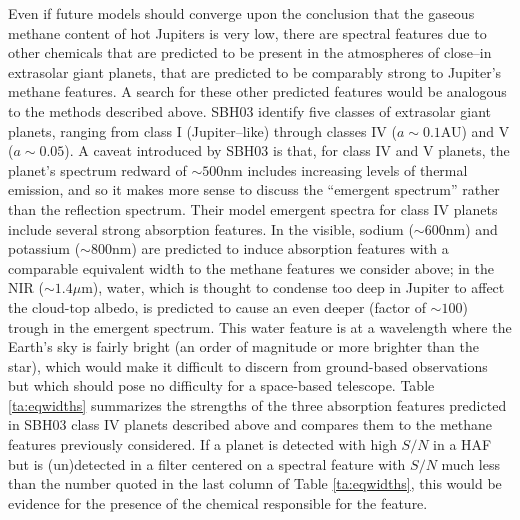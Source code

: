 Even if future models should converge upon the conclusion that the
gaseous methane content of hot Jupiters is very low, there are
spectral features due to other chemicals that are predicted to be
present in the atmospheres of close--in extrasolar giant planets, that
are predicted to be comparably strong to Jupiter's methane features.
A search for these other predicted features would be analogous to the
methods described above.  SBH03 identify five classes of extrasolar
giant planets, ranging from class I (Jupiter--like) through classes IV
($a\sim0.1$AU) and V ($a\sim0.05$).  A caveat introduced by SBH03 is
that, for class IV and V planets, the planet's spectrum redward of
$\sim500$nm includes increasing levels of thermal emission, and so it
makes more sense to discuss the ``emergent spectrum'' rather than the
reflection spectrum.  Their model emergent spectra for class IV
planets include several strong absorption features. In the visible,
sodium ($\sim600$nm) and potassium ($\sim800$nm) are predicted to
induce absorption features with a comparable equivalent width to the
methane features we consider above; in the NIR ($\sim1.4\mu$m), water,
which is thought to condense too deep in Jupiter to affect the
cloud-top albedo, is predicted to cause an even deeper (factor of
$\sim100$) trough in the emergent spectrum.  This water feature is at
a wavelength where the Earth's sky is fairly bright (an order of
magnitude or more brighter than the star), which would make it
difficult to discern from ground-based observations but which should
pose no difficulty for a space-based telescope.  Table
\ref{ta:eqwidths} summarizes the strengths of the three absorption
features predicted in SBH03 class IV planets described above and
compares them to the methane features previously considered.  If a
planet is detected with high $S/N$ in a HAF but is (un)detected in a
filter centered on a spectral feature with $S/N$ much less than the
number quoted in the last column of Table \ref{ta:eqwidths}, this
would be evidence for the presence of the chemical responsible for the
feature.


